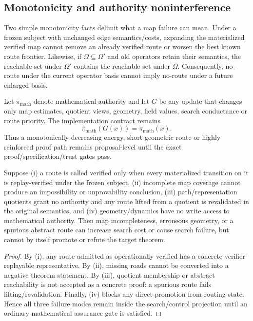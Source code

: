 \subsection{Monotonicity and authority noninterference}
Two simple monotonicity facts delimit what a map failure can mean. Under a frozen subject with unchanged edge semantics/costs, expanding the materialized verified map cannot remove an already verified route or worsen the best known route frontier. Likewise, if $\Omega\subseteq\Omega'$ and old operators retain their semantics, the reachable set under $\Omega'$ contains the reachable set under $\Omega$. Consequently, no-route under the current operator basis cannot imply no-route under a future enlarged basis.

Let $\pi_{\mathrm{math}}$ denote mathematical authority and let $G$ be any update that changes only map estimates, quotient views, geometry, field values, search conductance or route priority. The implementation contract remains
\[
\pi_{\mathrm{math}}(G(x))=\pi_{\mathrm{math}}(x).
\]
Thus a monotonically decreasing energy, short geometric route or highly reinforced proof path remains proposal-level until the exact proof/specification/trust gates pass.

\begin{proposition}
Suppose (i) a route is called verified only when every materialized transition on it is replay-verified under the frozen subject, (ii) incomplete map coverage cannot produce an impossibility or unprovability conclusion, (iii) path/representation quotients grant no authority and any route lifted from a quotient is revalidated in the original semantics, and (iv) geometry/dynamics have no write access to mathematical authority. Then map incompleteness, erroneous geometry, or a spurious abstract route can increase search cost or cause search failure, but cannot by itself promote or refute the target theorem.
\end{proposition}
\begin{proof}
By (i), any route admitted as operationally verified has a concrete verifier-replayable representative. By (ii), missing roads cannot be converted into a negative theorem statement. By (iii), quotient membership or abstract reachability is not accepted as a concrete proof: a spurious route fails lifting/revalidation. Finally, (iv) blocks any direct promotion from routing state. Hence all three failure modes remain inside the search/control projection until an ordinary mathematical assurance gate is satisfied.
\end{proof}

